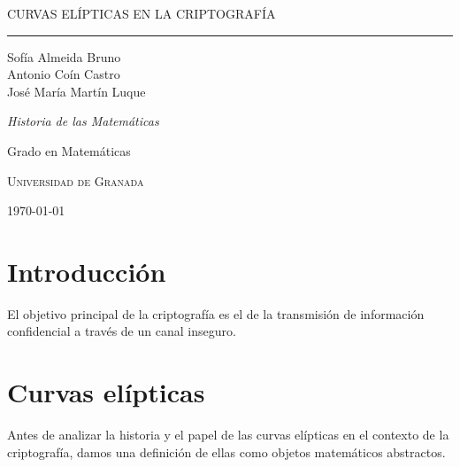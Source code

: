 \documentclass[
  a4paper,
  12pt,
  spanish,
]{scrartcl}
\DeclareRobustCommand{\spacedallcaps}[1]{{\linespread{1.3}\sacshape\MakeTextUppercase{#1}}}%
\newcommand{\horrule}[1]{\rule{\linewidth}{#1}}
\begin{document}
\begin{titlepage}
  \vspace*{4cm}

  \begin{flushleft}
    \Huge
    \spacedallcaps{Curvas Elípticas en la Criptografía}
    \horrule{2pt}
  \end{flushleft}

  \vspace{2em}

  \begin{flushright}
    \large
    Sofía Almeida Bruno\\
    Antonio Coín Castro\\
    José María Martín Luque\vspace{1em}
  
    \textit{Historia de las Matemáticas}
  
    Grado en Matemáticas
  
    \textsc{Universidad de Granada}\vspace{1em}
  
    \today\vspace{.5em}
  \end{flushright}
\end{titlepage}

\newpage

{\hypersetup{hidelinks}
\tableofcontents
}

\newpage

\section{Introducción}

El objetivo principal de la criptografía es el de la transmisión de información confidencial a través de un canal inseguro.

\section{Curvas elípticas}

Antes de analizar la historia y el papel de las curvas elípticas en el contexto de la criptografía, damos una definición de ellas como objetos matemáticos abstractos.
\end{document}
